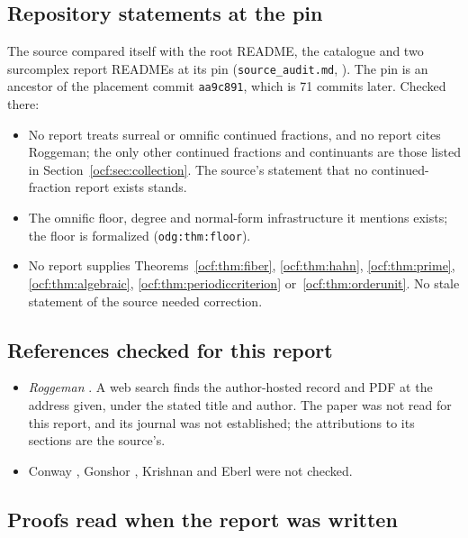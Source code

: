 \documentclass[11pt,a4paper]{article}
\numberwithin{equation}{section}
\theoremstyle{definition}
\theoremstyle{remark}
\newcommand{\rpath}[1]{\nolinkurl{#1}}%
\newcommand{\lbl}[1]{\nolinkurl{#1}}%
\begin{document}
\subsection{Repository statements at the pin}\label{ocf:app:pinned}

The source compared itself with the root README, the catalogue and two
surcomplex report READMEs at its pin (\rpath{source\_audit.md},
\cite{SurrealRepo}). The pin is an ancestor of the placement commit
\texttt{aa9c891}, which is 71 commits later. Checked there:
\begin{itemize}[leftmargin=*,itemsep=3pt]
\item No report treats surreal or omnific continued fractions, and no report
cites Roggeman; the only other continued fractions and continuants are
those listed in Section~\ref{ocf:sec:collection}. The source's statement
that no continued-fraction report exists stands.
\item The omnific floor, degree and normal-form infrastructure it mentions
exists; the floor is formalized (\lbl{odg:thm:floor}).
\item No report supplies Theorems~\ref{ocf:thm:fiber}, \ref{ocf:thm:hahn},
\ref{ocf:thm:prime}, \ref{ocf:thm:algebraic}, \ref{ocf:thm:periodiccriterion}
or~\ref{ocf:thm:orderunit}. No stale statement of the source needed
correction.
\end{itemize}

\subsection{References checked for this report}\label{ocf:app:literature}

\begin{itemize}[leftmargin=*,itemsep=3pt]
\item \emph{Roggeman} \cite{Roggeman}. A web search finds the
author-hosted record and PDF at the address given, under the stated title
and author. The paper was not read for this report, and its journal was
not established; the attributions to its sections are the source's.
\item Conway \cite{Conway}, Gonshor \cite{Gonshor}, Krishnan
\cite{Krishnan} and Eberl \cite{Eberl} were not checked.
\end{itemize}

\subsection{Proofs read when the report was written}\label{ocf:app:checked}
\end{document}
